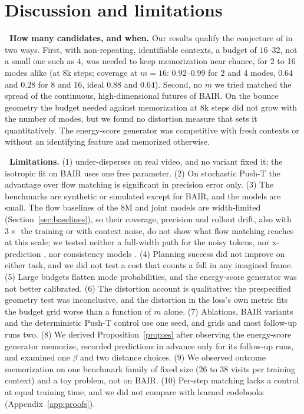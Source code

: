 \section{Discussion and limitations}
\label{sec:discussion}
\leavevmode{}\textbf{\thesubsection\ How many candidates, and when.} Our results qualify the conjecture of \citet{gladstone2026xm} in two ways. First, with non-repeating, identifiable contexts, a budget of $16$--$32$, not a small one such as $4$, was needed to keep memorization near chance, for 2 to 16 modes alike (at 8k steps; coverage at $m{=}16$: $0.92$--$0.99$ for 2 and 4 modes, $0.64$ and $0.28$ for 8 and 16, ideal $0.88$ and $0.64$). Second, no $m$ we tried matched the spread of the continuous, high-dimensional futures of BAIR. On the bounce geometry the budget needed against memorization at 8k steps did not grow with the number of modes, but we found no distortion measure that sets it quantitatively. The energy-score generator \citep{makabe2026esp} was competitive with fresh contexts or without an identifying feature and memorized otherwise.

\leavevmode{}\textbf{\thesubsection\ Limitations.} (1) \imlewm{} under-disperses on real video, and no variant fixed it; the isotropic fit on BAIR uses one free parameter. (2) On stochastic Push-T the advantage over flow matching is significant in precision error only. (3) The benchmarks are synthetic or simulated except for BAIR, and the models are small. The flow baselines of the 8M and joint models are width-limited (Section~\ref{sec:baselines}), so their coverage, precision and rollout drift, also with $3\times$ the training or with context noise, do not show what flow matching reaches at this scale; we tested neither a full-width path for the noisy tokens, nor x-prediction \citep{li2025jit}, nor consistency models \citep{song2023consistency}. (4) Planning success did not improve on either task, and we did not test a cost that counts a fall in any imagined frame. (5) Large budgets flatten mode probabilities, and the energy-score generator was not better calibrated. (6) The distortion account is qualitative: the prespecified geometry test was inconclusive, and the distortion in the loss's own metric fits the budget grid worse than a function of $m$ alone. (7) Ablations, BAIR variants and the deterministic Push-T control use one seed, and grids and most follow-up runs two. (8) We derived Proposition~\ref{prop:es} after observing the energy-score generator memorize, recorded predictions in advance only for its follow-up runs, and examined one $\beta$ and two distance choices. (9) We observed outcome memorization on one benchmark family of fixed size (26 to 38 visits per training context) and a toy problem, not on BAIR. (10) Per-step matching lacks a control at equal training time, and we did not compare with learned codebooks (Appendix~\ref{app:proofs}).

